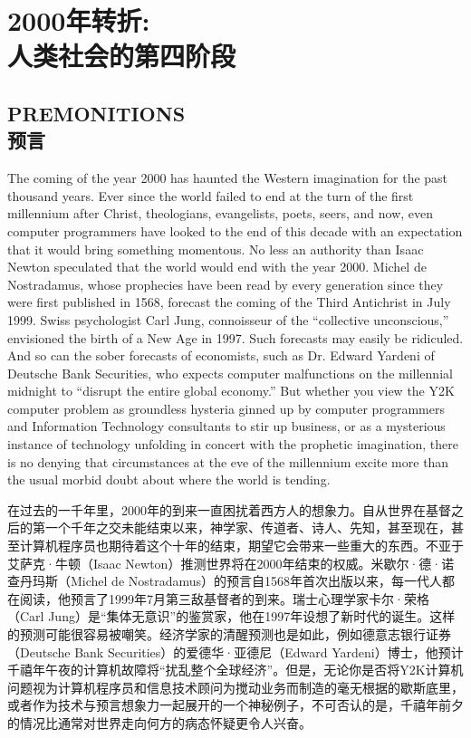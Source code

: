 \chapter[人类社会第四个阶段]{2000年转折: \\ 人类社会的第四阶段}

\section[预言]{PREMONITIONS\\ 预言}

\begin{paracol}{2}[]
The coming of the year 2000 has haunted the Western imagination for the past thousand years. Ever since the world failed to end at the turn of the first millennium after Christ, theologians, evangelists, poets, seers, and now, even computer programmers have looked to the end of this decade with an expectation that it would bring something momentous. No less an authority than Isaac Newton speculated that the world would end with the year 2000. Michel de Nostradamus, whose prophecies have been read by every generation since they were first published in 1568, forecast the coming of the Third Antichrist in July 1999. Swiss psychologist Carl Jung, connoisseur of the “collective unconscious,” envisioned the birth of a New Age in 1997. Such forecasts may easily be ridiculed. And so can the sober forecasts of economists, such as Dr. Edward Yardeni of Deutsche Bank Securities, who expects computer malfunctions on the millennial midnight to “disrupt the entire global economy.” But whether you view the Y2K computer problem as groundless hysteria ginned up by computer programmers and Information Technology consultants to stir up business, or as a mysterious instance of technology unfolding in concert with the prophetic imagination, there is no denying that circumstances at the eve of the millennium excite more than the usual morbid doubt about where the world is tending.

\switchcolumn
在过去的一千年里，2000年的到来一直困扰着西方人的想象力。自从世界在基督之后的第一个千年之交未能结束以来，神学家、传道者、诗人、先知，甚至现在，甚至计算机程序员也期待着这个十年的结束，期望它会带来一些重大的东西。不亚于艾萨克·牛顿（Isaac Newton）推测世界将在2000年结束的权威。米歇尔·德·诺查丹玛斯（Michel de Nostradamus）的预言自1568年首次出版以来，每一代人都在阅读，他预言了1999年7月第三敌基督者的到来。瑞士心理学家卡尔·荣格（Carl Jung）是“集体无意识”的鉴赏家，他在1997年设想了新时代的诞生。这样的预测可能很容易被嘲笑。经济学家的清醒预测也是如此，例如德意志银行证券（Deutsche Bank Securities）的爱德华·亚德尼（Edward Yardeni）博士，他预计千禧年午夜的计算机故障将“扰乱整个全球经济”。但是，无论你是否将Y2K计算机问题视为计算机程序员和信息技术顾问为搅动业务而制造的毫无根据的歇斯底里，或者作为技术与预言想象力一起展开的一个神秘例子，不可否认的是，千禧年前夕的情况比通常对世界走向何方的病态怀疑更令人兴奋。
\end{paracol}
